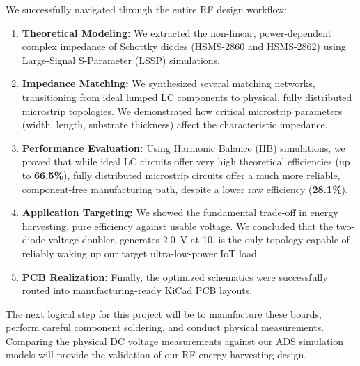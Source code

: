 We successfully navigated through the entire RF design workflow:
\begin{enumerate}
    \item \textbf{Theoretical Modeling:} We extracted the non-linear, power-dependent complex impedance of Schottky diodes (HSMS-2860 and HSMS-2862) using Large-Signal S-Parameter (LSSP) simulations.
    \item \textbf{Impedance Matching:} We synthesized several matching networks, transitioning from ideal lumped LC components to physical, fully distributed microstrip topologies. We demonstrated how critical microstrip parameters (width, length, substrate thickness) affect the characteristic impedance.
    \item \textbf{Performance Evaluation:} Using Harmonic Balance (HB) simulations, we proved that while ideal LC circuits offer very high theoretical efficiencies (up to \textbf{66.5\%}), fully distributed microstrip circuits offer a much more reliable, component-free manufacturing path, despite a lower raw efficiency (\textbf{28.1\%}).
    \item \textbf{Application Targeting:} We showed the fundamental trade-off in energy harvesting, pure efficiency against usable voltage. We concluded that the two-diode voltage doubler, generates \SI{2.0}{\volt} at \SI{10}{\dBm}, is the only topology capable of reliably waking up our target ultra-low-power IoT load.
    \item \textbf{PCB Realization:} Finally, the optimized schematics were successfully routed into manufacturing-ready KiCad PCB layouts.
\end{enumerate}

The next logical step for this project will be to manufacture these boards, perform careful component soldering, and conduct physical measurements. Comparing the physical DC voltage measurements against our ADS simulation models will provide the validation of our RF energy harvesting design.